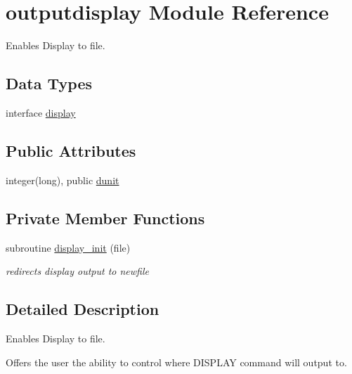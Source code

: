 \hypertarget{classoutputdisplay}{\section{outputdisplay Module Reference}
\label{classoutputdisplay}
}


Enables Display to file.  


\subsection*{Data Types}
\begin{DoxyCompactItemize}
\item 
interface \hyperlink{interfaceoutputdisplay_1_1display}{display}
\end{DoxyCompactItemize}
\subsection*{Public Attributes}
\begin{DoxyCompactItemize}
\item 
integer(long), public \hyperlink{classoutputdisplay_a37a1610ae7e198bc24d119cea584a6f2}{dunit}
\end{DoxyCompactItemize}
\subsection*{Private Member Functions}
\begin{DoxyCompactItemize}
\item 
subroutine \hyperlink{classoutputdisplay_a9a8a15080a89f2947af09f8fb326a2e0}{display\+\_\+init} (file)
\begin{DoxyCompactList}\small\item\em redirects display output to newfile \end{DoxyCompactList}\end{DoxyCompactItemize}


\subsection{Detailed Description}
Enables Display to file. 

Offers the user the ability to control where D\+I\+S\+P\+L\+A\+Y command will output to. 

